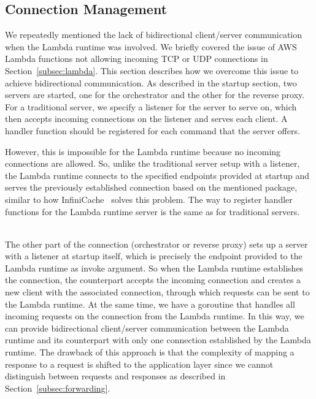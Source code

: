 \subsection{Connection Management}
We repeatedly mentioned the lack of bidirectional client/server communication when the Lambda runtime was involved. We briefly covered the issue of AWS Lambda functions not allowing incoming TCP or UDP connections in Section~\ref{subsec:lambda}. This section describes how we overcome this issue to achieve bidirectional communication. As described in the startup section, two servers are started, one for the orchestrator and the other for the reverse proxy. For a traditional server, we specify a listener for the server to serve on, which then accepts incoming connections on the listener and serves each client. A handler function should be registered for each command that the server offers.

\newpage
\noindent
However, this is impossible for the Lambda runtime because no incoming connections are allowed. So, unlike the traditional server setup with a listener, the Lambda runtime connects to the specified endpoints provided at startup and serves the previously established connection based on the mentioned  package, similar to how InfiniCache~\cite{wang_infinicache_2020} solves this problem. The way to register handler functions for the Lambda runtime server is the same as for traditional servers. 

~\\
The other part of the connection (orchestrator or reverse proxy) sets up a server with a listener at startup itself, which is precisely the endpoint provided to the Lambda runtime as invoke argument. So when the Lambda runtime establishes the connection, the counterpart accepts the incoming connection and creates a new client with the associated connection, through which requests can be sent to the Lambda runtime. At the same time, we have a goroutine that handles all incoming requests on the connection from the Lambda runtime. In this way, we can provide bidirectional client/server communication between the Lambda runtime and its counterpart with only one connection established by the Lambda runtime. The drawback of this approach is that the complexity of mapping a response to a request is shifted to the application layer since we cannot distinguish between requests and responses as described in Section~\ref{subsec:forwarding}.

